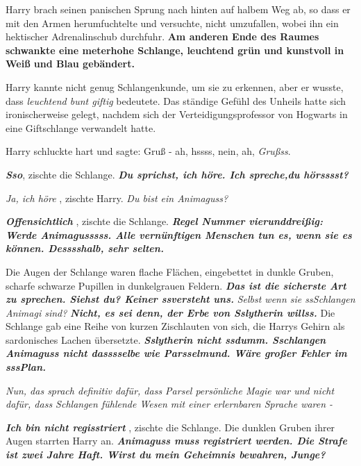 Harry brach seinen panischen Sprung nach hinten auf halbem Weg ab, so dass er
mit den Armen herumfuchtelte und versuchte, nicht umzufallen, wobei ihn ein
hektischer Adrenalinschub durchfuhr. \textbf{Am anderen Ende des Raumes
schwankte eine meterhohe Schlange, leuchtend grün und kunstvoll in Weiß und Blau
gebändert.}

Harry kannte nicht genug Schlangenkunde, um sie zu erkennen, aber er wusste,
dass \emph{ \glqq{}leuchtend bunt\grqq{} \glqq{}giftig\grqq{}} bedeutete. Das
ständige Gefühl des Unheils hatte sich ironischerweise gelegt, nachdem sich der
Verteidigungsprofessor von Hogwarts in eine Giftschlange verwandelt hatte.

Harry schluckte hart und sagte: \glqq{}Gruß - ah, hssss, nein, ah,
\emph{Grußss}.\grqq{}

\glqq{}\textbf{\emph{Sso}}\grqq{}, zischte die Schlange. \textbf{\emph{\glqq{}Du
sprichst, ich höre. Ich spreche,du hörsssst?\grqq{}} }

\emph{\glqq{}Ja, ich höre\grqq{}} , zischte Harry. \emph{\glqq{}Du bist ein
Animaguss?\grqq{}}

\textbf{\emph{ \glqq{}Offensichtlich\grqq{}} }, zischte die Schlange.
\textbf{\emph{ \glqq{}Regel Nummer vierunddreißig: Werde Animagusssss. Alle
vernünftigen Menschen tun es, wenn sie es können. Desssshalb, sehr
selten.\grqq{}} }

Die Augen der Schlange waren flache Flächen, eingebettet in dunkle Gruben,
scharfe schwarze Pupillen in dunkelgrauen Feldern. \textbf{\emph{ \glqq{}Das ist
die sicherste Art zu sprechen. Siehst du? Keiner ssversteht uns.\grqq{}} }
\emph{\glqq{}Selbst wenn sie ssSchlangen Animagi sind?\grqq{}} \textbf{\emph{ \glqq{}
Nicht, es sei denn, der Erbe von Sslytherin willss.\grqq{}} } Die Schlange gab
eine Reihe von kurzen Zischlauten von sich, die Harrys Gehirn als sardonisches
Lachen übersetzte. \textbf{\emph{ \glqq{}Sslytherin nicht ssdumm. Sschlangen
Animaguss nicht dasssselbe wie Parsselmund. Wäre großer Fehler im
sssPlan.\grqq{}} }

\emph{Nun, das sprach definitiv dafür, dass Parsel persönliche Magie war und
nicht dafür, dass Schlangen fühlende Wesen mit einer erlernbaren Sprache
waren -}

\textbf{\emph{ \glqq{}Ich bin nicht regisstriert\grqq{}} }, zischte die Schlange.
Die dunklen Gruben ihrer Augen starrten Harry an. \textbf{\emph{ \glqq{}Animaguss
muss registriert werden. Die Strafe ist zwei Jahre Haft. Wirst du mein Geheimnis
bewahren, Junge?}}\grqq{}

